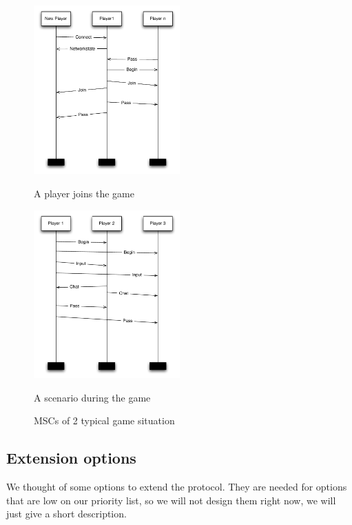     \begin{figure}[!ht]
      \centering
      \includegraphics[width=0.5\textwidth]{diagrams/MSC_join}
      \caption{A player joins the game} \label{fig:MSC_join}

      \includegraphics[width=0.5\textwidth]{diagrams/MSC_turn}
      \caption{A scenario during the game} \label{fig:MSC_turn}

      \caption{MSCs of 2 typical game situation} \label{fig:MSCs}
    \end{figure}


    \subsection{Extension options}
    We thought of some options to extend the protocol. They are needed for options that are low on our priority list, so we will not design them right now, we will just give a short description.

